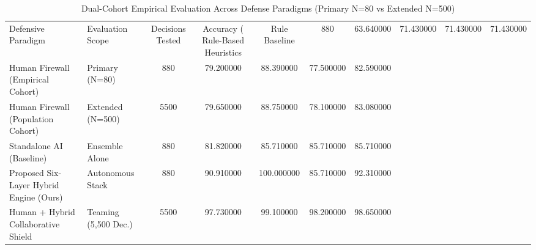 \begin{table}
\caption{Dual-Cohort Empirical Evaluation Across Defense Paradigms (Primary N=80 vs Extended N=500)}
\label{tab:cohort_statistical_power}
\begin{tabular}{llccccc}
\toprule
Defensive Paradigm & Evaluation Scope & Decisions Tested & Accuracy (%
\midrule
Rule-Based Heuristics & Rule Baseline & 880 & 63.640000 & 71.430000 & 71.430000 & 71.430000 \\
Human Firewall (Empirical Cohort) & Primary (N=80) & 880 & 79.200000 & 88.390000 & 77.500000 & 82.590000 \\
Human Firewall (Population Cohort) & Extended (N=500) & 5500 & 79.650000 & 88.750000 & 78.100000 & 83.080000 \\
Standalone AI (Baseline) & Ensemble Alone & 880 & 81.820000 & 85.710000 & 85.710000 & 85.710000 \\
Proposed Six-Layer Hybrid Engine (Ours) & Autonomous Stack & 880 & 90.910000 & 100.000000 & 85.710000 & 92.310000 \\
Human + Hybrid Collaborative Shield & Teaming (5,500 Dec.) & 5500 & 97.730000 & 99.100000 & 98.200000 & 98.650000 \\
\bottomrule
\end{tabular}
\end{table}
